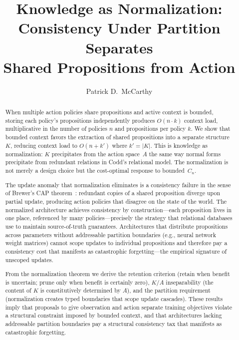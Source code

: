 \documentclass[11pt]{article}
\title{Knowledge as Normalization:\\Consistency Under Partition Separates\\Shared Propositions from Action}
\author{Patrick D.\ McCarthy}
\date{}
\theoremstyle{definition}
\theoremstyle{remark}
\begin{document}
\maketitle

\begin{abstract}
When multiple action policies share propositions and active context is
bounded, storing each policy's propositions independently produces
$O(n \cdot k)$ context load, multiplicative in the number of policies
$n$ and propositions per policy $k$. We show that bounded context
favors the extraction of shared propositions into a separate
structure~$K$, reducing context load to $O(n + k')$ where $k' = |K|$.
This is knowledge as normalization: $K$ precipitates from the action
space~$A$ the same way normal forms precipitate from redundant
relations in Codd's relational model. The normalization is not merely a
design choice but the cost-optimal response to bounded~$C_n$.

The update anomaly that normalization eliminates is a consistency
failure in the sense of Brewer's CAP theorem~\cite{Brewer2000}: redundant copies of a shared
proposition diverge upon partial update, producing action policies
that disagree on the state of the world. The normalized architecture
achieves consistency by construction---each proposition lives in one
place, referenced by many policies---precisely the strategy that
relational databases use to maintain source-of-truth guarantees.
Architectures that distribute propositions across parameters without
addressable partition boundaries (e.g., neural network weight
matrices) cannot scope updates to individual propositions and
therefore pay a consistency cost that manifests as catastrophic
forgetting---the empirical signature of unscoped updates.

From the normalization theorem we derive the retention criterion
(retain when benefit is uncertain; prune only when benefit is
certainly zero), $K/A$ inseparability (the content of $K$ is
constitutively determined by $A$), and the partition requirement
(normalization creates typed boundaries that scope update cascades).
These results imply that proposals to give observation and action separate
training objectives violate a structural constraint imposed by bounded context,
and that architectures lacking addressable partition boundaries pay
a structural consistency tax that manifests as catastrophic forgetting.
\end{abstract}

\end{document}

